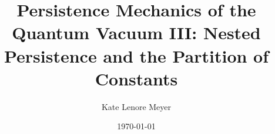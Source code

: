\documentclass[aps,prd,twocolumn,showpacs,superscriptaddress,groupedaddress,nofootinbib,english]{revtex4-2}
\begin{document}

\title{Persistence Mechanics of the Quantum Vacuum III: Nested Persistence and the Partition of Constants}

\author{Kate Lenore Meyer}

\date{\today}



\maketitle %
























\appendix



\end{document}
